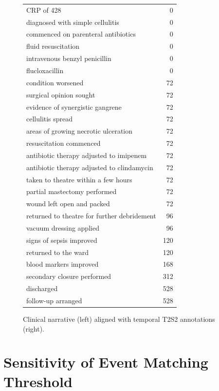 \documentclass[pmlr,twocolumn,10pt]{jmlr} %
\begin{document}
\begin{figure}[!ht]
\begin{tcolorbox}[annopanel]
\begin{minipage}[t]{0.48\textwidth}
\begin{tcolorbox}[annobox,title={T2S2 annotation}]
\begin{tabular}{P{0.78\textwidth} r}
CRP of 428 & 0 \\
diagnosed with simple cellulitis & 0 \\
commenced on parenteral antibiotics & 0 \\
fluid resuscitation & 0 \\
intravenous benzyl penicillin & 0 \\
flucloxacillin & 0 \\
condition worsened & 72 \\
surgical opinion sought & 72 \\
evidence of synergistic gangrene & 72 \\
cellulitis spread & 72 \\
areas of growing necrotic ulceration & 72 \\
resuscitation commenced & 72 \\
antibiotic therapy adjusted to imipenem & 72 \\
antibiotic therapy adjusted to clindamycin & 72 \\
taken to theatre within a few hours & 72 \\
partial mastectomy performed & 72 \\
wound left open and packed & 72 \\
returned to theatre for further debridement & 96 \\
vacuum dressing applied & 96 \\
signs of sepsis improved & 120 \\
returned to the ward & 120 \\
blood markers improved & 168 \\
secondary closure performed & 312 \\
discharged & 528 \\
follow-up arranged & 528 \\
\bottomrule
\end{tabular}
\end{tcolorbox}
\end{minipage}

\end{tcolorbox}

\caption{Clinical narrative (left) aligned with temporal T2S2 annotations (right).}
\label{fig:fine-grained-t2s2-annotation}
\end{figure}


\clearpage
\section{Sensitivity of Event Matching Threshold}
\label{apd:threshold_sweep}
\end{document}
